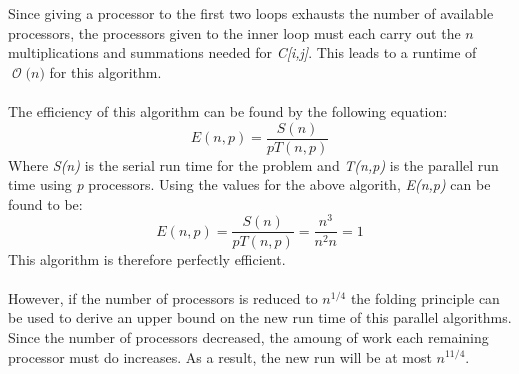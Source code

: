 \documentclass[12pt]{article}
\newcommand{\BigO}[1]{\ensuremath{\operatorname{\mathcal{O}}\bigl(#1\bigr)}}
\begin{document}
Since giving a processor to the first two loops exhausts the number
of available processors, the processors given to the inner loop
must each carry out the $n$ multiplications and summations
needed for \textit{C[i,j]}.  This leads to a runtime of \BigO{n} for 
this algorithm.\\\\
The efficiency of this algorithm can be found by the following equation:
\[
    E(n,p) = \frac{S(n)}{pT(n,p)}
\]
Where \textit{S(n)} is the serial run time for the problem and \textit{T(n,p)}
is the parallel run time using \textit{p} processors.  Using the values for the
above algorith, \textit{E(n,p)} can be found to be:
\[
    E(n,p) = \frac{S(n)}{pT(n,p)} = \frac{n^3}{n^2 n} = 1
\]
This algorithm is therefore perfectly efficient.\\\\
However, if the number of processors is reduced to $n^{1/4}$ the folding
principle can be used to derive an upper bound on the new run time of 
this parallel algorithms.  Since the number of processors decreased,
the amoung of work each remaining processor must do increases.  As
a result, the new run will be at most $n^{11/4}$.
\end{document}
